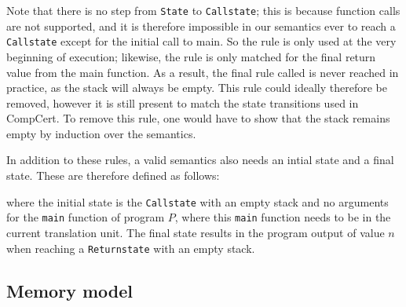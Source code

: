 Note that there is no step from \texttt{State} to \texttt{Callstate}; this is
because function calls are not supported, and it is therefore impossible in our
semantics ever to reach a \texttt{Callstate} except for the initial call to
main. So the  rule is only used at the very beginning
of execution; likewise, the  rule is only matched for
the final return value from the main function.  As a result, the final rule
called  is never reached in practice, as the stack will always be empty.  This rule could ideally therefore be removed,
however it is still present to match the state transitions used in CompCert.  To
remove this rule, one would have to show that the stack remains empty by
induction over the semantics.

In addition to these rules, a valid semantics also needs an intial state and a
final state.  These are therefore defined as follows:
%

\noindent where the initial state is the \texttt{Callstate} with an empty stack and no arguments for the \texttt{main} function of program $P$, where this
\texttt{main} function needs to be in the current translation unit.  The final
state results in the program output of value $n$ when reaching a
\texttt{Returnstate} with an empty stack.

\subsection{Memory model}\label{sec:verilog:memory}

